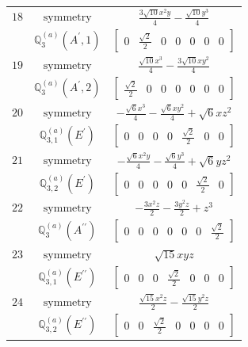 \documentclass[fleqn,8pt,landscape]{jsarticle}
\begin{document}
\begin{longtable}{ccc}
$ 18 $ & $ \text{symmetry} $ & $ \frac{3 \sqrt{10} x^{2} y}{4} - \frac{\sqrt{10} y^{3}}{4} $ \\
$  $ & $ \mathbb{Q}_{3}^{(a)}(A^{\prime},1) $ & $ \begin{bmatrix} 0 & \frac{\sqrt{2}}{2} & 0 & 0 & 0 & 0 & 0 \end{bmatrix} $ \\ \hline
$ 19 $ & $ \text{symmetry} $ & $ \frac{\sqrt{10} x^{3}}{4} - \frac{3 \sqrt{10} x y^{2}}{4} $ \\
$  $ & $ \mathbb{Q}_{3}^{(a)}(A^{\prime},2) $ & $ \begin{bmatrix} \frac{\sqrt{2}}{2} & 0 & 0 & 0 & 0 & 0 & 0 \end{bmatrix} $ \\ \hline
$ 20 $ & $ \text{symmetry} $ & $ - \frac{\sqrt{6} x^{3}}{4} - \frac{\sqrt{6} x y^{2}}{4} + \sqrt{6} x z^{2} $ \\
$  $ & $ \mathbb{Q}_{3,1}^{(a)}(E^{\prime}) $ & $ \begin{bmatrix} 0 & 0 & 0 & 0 & \frac{\sqrt{2}}{2} & 0 & 0 \end{bmatrix} $ \\ \hline
$ 21 $ & $ \text{symmetry} $ & $ - \frac{\sqrt{6} x^{2} y}{4} - \frac{\sqrt{6} y^{3}}{4} + \sqrt{6} y z^{2} $ \\
$  $ & $ \mathbb{Q}_{3,2}^{(a)}(E^{\prime}) $ & $ \begin{bmatrix} 0 & 0 & 0 & 0 & 0 & \frac{\sqrt{2}}{2} & 0 \end{bmatrix} $ \\ \hline
$ 22 $ & $ \text{symmetry} $ & $ - \frac{3 x^{2} z}{2} - \frac{3 y^{2} z}{2} + z^{3} $ \\
$  $ & $ \mathbb{Q}_{3}^{(a)}(A^{\prime\prime}) $ & $ \begin{bmatrix} 0 & 0 & 0 & 0 & 0 & 0 & \frac{\sqrt{2}}{2} \end{bmatrix} $ \\ \hline
$ 23 $ & $ \text{symmetry} $ & $ \sqrt{15} x y z $ \\
$  $ & $ \mathbb{Q}_{3,1}^{(a)}(E^{\prime\prime}) $ & $ \begin{bmatrix} 0 & 0 & 0 & \frac{\sqrt{2}}{2} & 0 & 0 & 0 \end{bmatrix} $ \\ \hline
$ 24 $ & $ \text{symmetry} $ & $ \frac{\sqrt{15} x^{2} z}{2} - \frac{\sqrt{15} y^{2} z}{2} $ \\
$  $ & $ \mathbb{Q}_{3,2}^{(a)}(E^{\prime\prime}) $ & $ \begin{bmatrix} 0 & 0 & \frac{\sqrt{2}}{2} & 0 & 0 & 0 & 0 \end{bmatrix} $ \\ \hline

\end{longtable}
\end{document}
